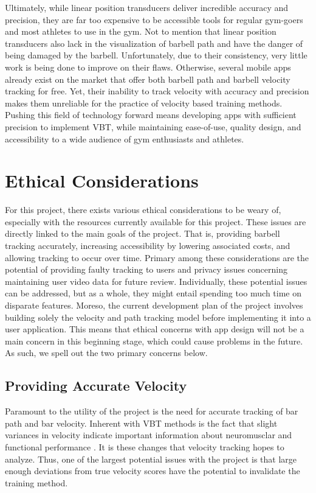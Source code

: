\documentclass[10pt,twocolumn]{article}
\begin{document}
Ultimately, while linear position transducers deliver incredible accuracy and precision, they are far too expensive to be accessible tools for regular gym-goers and most athletes to use in the gym.
Not to mention that linear position transducers also lack in the visualization of barbell path and have the danger of being damaged by the barbell.
Unfortunately, due to their consistency, very little work is being done to improve on their flaws. 
Otherwise, several mobile apps already exist on the market that offer both barbell path and barbell velocity tracking for free.
Yet, their inability to track velocity with accuracy and precision makes them unreliable for the practice of velocity based training methods.
Pushing this field of technology forward means developing apps with sufficient precision to implement VBT, while maintaining ease-of-use, quality design, and accessibility to a wide audience of gym enthusiasts and athletes.

\section{Ethical Considerations}
For this project, there exists various ethical considerations to be weary of, especially with the resources currently available for this project. 
These issues are directly linked to the main goals of the project. 
That is, providing barbell tracking accurately, increasing accessibility by lowering associated costs, and allowing tracking to occur over time. 
Primary among these considerations are the potential of providing faulty tracking to users and privacy issues concerning maintaining user video data for future review. 
Individually, these potential issues can be addressed, but as a whole, they might entail spending too much time on disparate features. 
Moreso, the current development plan of the project involves building solely the velocity and path tracking model before implementing it into a user application.
This means that ethical concerns with app design will not be a main concern in this beginning stage, which could cause problems in the future. 
As such, we spell out the two primary concerns below.

\subsection{Providing Accurate Velocity}
Paramount to the utility of the project is the need for accurate tracking of bar path and bar velocity. 
Inherent with VBT methods is the fact that slight variances in velocity indicate important information about neuromusclar and functional performance \cite{Dorrell2020}. 
It is these changes that velocity tracking hopes to analyze. 
Thus, one of the largest potential issues with the project is that large enough deviations from true velocity scores have the potential to invalidate the training method.  \par
\end{document}
